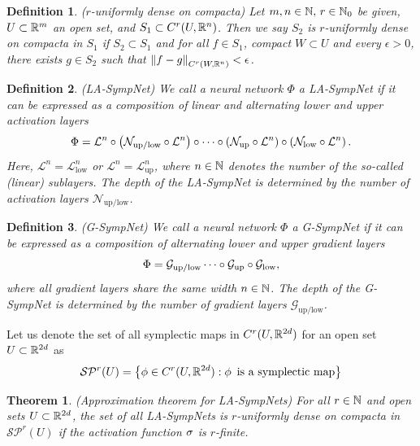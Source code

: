 \documentclass[twoside,a4paper]{article}
\newtheorem{definition}{Definition}
\newtheorem{theorem}{Theorem}
\begin{document}
\begin{definition}
	($r$-uniformly dense on compacta)
	Let $m,n \in \mathbb{N}, \, r \in \mathbb{N}_0$ be given, $U \subset \mathbb{R}^m$ an open set,
	and $S_1 \subset C^r(U,\mathbb{R}^n)$. Then we say $S_2$ is $r$-uniformly dense
	on compacta in $S_1$ if $S_2 \subset S_1$ and for all $f \in S_1$, compact
	$W \subset U$ and every $\epsilon > 0$, there exists $g \in S_2$ such that
	$\left\lVert{f-g}\right\rVert_{C^r(W,\mathbb{R}^n)} < \epsilon$.
\end{definition}

\begin{definition}\label{def_la_sympnet}
	(LA-SympNet)
	We call a neural network $\Phi$ a LA-SympNet if it can be expressed as
	a composition of linear and alternating lower and upper activation layers
	\begin{equation*}
		\Phi = \mathcal{L}^n
		\circ \left( \mathcal{N}_{\text{up/low}} \circ \mathcal{L}^n \right) \circ
		\cdots
		\circ \left( \mathcal{N}_{\text{up}} \circ \mathcal{L}^n \right)
		\circ \left( \mathcal{N}_{\text{low}} \circ \mathcal{L}^n \right)
		.
	\end{equation*}
	Here, $\mathcal{L}^n = \mathcal{L}_{\text{low}}^n$ or $\mathcal{L}^n = \mathcal{L}_{\text{up}}^n$,
	where $n \in \mathbb{N}$ denotes the number of the so-called (linear) sublayers.
	The depth of the LA-SympNet is determined by the number of activation layers
	$\mathcal{N}_{\text{up/low}}$.
\end{definition}

\begin{definition}\label{def_g_sympnet}
	(G-SympNet)
	We call a neural network $\Phi$ a G-SympNet if it can be expressed as a composition
	of alternating lower and upper gradient layers
	\begin{equation*}
		\Phi = \mathcal{G}_{\text{up/low}} \cdots \circ \mathcal{G}_{\text{up}} \circ \mathcal{G}_{\text{low}},
	\end{equation*}
	where all gradient layers share the same width $n \in \mathbb{N}$.
	The depth of the G-SympNet is determined by the number of gradient layers
	$\mathcal{G}_{\text{up/low}}$.
\end{definition}

Let us denote the set of all symplectic maps in $C^r(U, \mathbb{R}^{2d})$ for an open set $U \subset \mathbb{R}^{2d}$ as
\begin{equation*}
	\mathcal{S}\mathcal{P}^r(U) = \left\{ 
		\phi \in C^r(U, \mathbb{R}^{2d}) : \phi \, \text{ is a symplectic map}
	\right\}
\end{equation*}

\begin{theorem}
	(Approximation theorem for LA-SympNets)
	For all $r \in \mathbb{N}$ and open sets $U \subset \mathbb{R}^{2d}$, the set of all LA-SympNets
	is $r$-uniformly dense on compacta in $\mathcal{S}\mathcal{P}^r(U)$ if the activation function
	$\sigma$ is $r$-finite.
\end{theorem}
\end{document}
